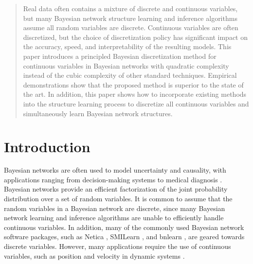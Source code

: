 \date{Received: date / Accepted: date}

\maketitle

\begin{abstract}

Real data often contains a mixture of discrete and continuous variables, but many Bayesian network structure learning and inference algorithms assume all random variables are discrete.
Continuous variables are often discretized, but the choice of discretization policy has significant impact on the accuracy, speed, and interpretability of the resulting models.
This paper introduces a principled Bayesian discretization method for continuous variables in Bayesian networks with quadratic complexity instead of the cubic complexity of other standard techniques.
Empirical demonstrations show that the proposed method is superior to the state of the art.
In addition, this paper shows how to incorporate existing methods into the structure learning process to discretize all continuous variables and simultaneously learn Bayesian network structures.

\end{abstract}


\section{Introduction}

Bayesian networks \citep{Pearl_1988, PGM_2009} are often used to model uncertainty and causality, with applications ranging from decision-making systems \citep{kochenderfer2012next} to medical diagnosis \citep{Lustgarten_2011}.
Bayesian networks provide an efficient factorization of the joint probability distribution over a set of random variables.
It is common to assume that the random variables in a Bayesian network are discrete, since many Bayesian network learning and inference algorithms are unable to efficiently handle continuous variables.
In addition, many of the commonly used Bayesian network software packages, such as Netica \citep{netica1992}, SMILearn \citep{druzdzel1999smile}, and bnlearn \citep{bnlearn2010}, are geared towards discrete variables.
However, many applications require the use of continuous variables, such as position and velocity in dynamic systems \citep{kochenderfer2010airspace}.

